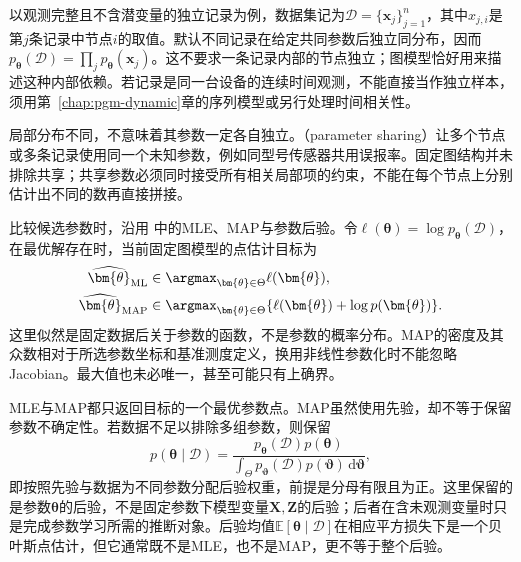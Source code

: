 以观测完整且不含潜变量的独立记录为例，数据集记为$\mathcal{D}=\{\bm{x}_j\}_{j=1}^n$，其中$x_{j,i}$是第$j$条记录中节点$i$的取值。默认不同记录在给定共同参数后独立同分布，因而$p_{\bm{\theta}}(\mathcal{D})=\prod_jp_{\bm{\theta}}(\bm{x}_j)$。这不要求一条记录内部的节点独立；图模型恰好用来描述这种内部依赖。若记录是同一台设备的连续时间观测，不能直接当作独立样本，须用第~\ref{chap:pgm-dynamic}章的序列模型或另行处理时间相关性。

局部分布不同，不意味着其参数一定各自独立。（parameter sharing）让多个节点或多条记录使用同一个未知参数，例如同型号传感器共用误报率。固定图结构并未排除共享；共享参数必须同时接受所有相关局部项的约束，不能在每个节点上分别估计出不同的数再直接拼接。

比较候选参数时，沿用
中的MLE、MAP与参数后验。令$\ell(\bm{\theta})=\log p_{\bm{\theta}}(\mathcal{D})$，
在最优解存在时，当前固定图模型的点估计目标为
\begin{equation}
  \begin{aligned}
    \widehat{\bm{\theta}}_{\mathrm{ML}}
      &\in\argmax_{\bm{\theta}\in\Theta}\ell(\bm{\theta}),\\
    \widehat{\bm{\theta}}_{\mathrm{MAP}}
      &\in\argmax_{\bm{\theta}\in\Theta}
        \{\ell(\bm{\theta})+\log p(\bm{\theta})\}.
  \end{aligned}
  \label{eq:pgm-parameter-learning-point-objectives}
\end{equation}
这里似然是固定数据后关于参数的函数，不是参数的概率分布。MAP的密度及其众数相对于所选参数坐标和基准测度定义，换用非线性参数化时不能忽略Jacobian。最大值也未必唯一，甚至可能只有上确界。

MLE与MAP都只返回目标的一个最优参数点。MAP虽然使用先验，却不等于保留参数不确定性。若数据不足以排除多组参数，则保留
\begin{equation}
  p(\bm{\theta}\mid\mathcal{D})
  =\frac{p_{\bm{\theta}}(\mathcal{D})p(\bm{\theta})}
  {\int_\Theta p_{\bm{\vartheta}}(\mathcal{D})
    p(\bm{\vartheta})\,\mathrm{d}\bm{\vartheta}},
  \label{eq:pgm-parameter-learning-parameter-posterior}
\end{equation}
即按照先验与数据为不同参数分配后验权重，前提是分母有限且为正。这里保留的是参数$\bm{\theta}$的后验，不是固定参数下模型变量$\bm{X},\bm{Z}$的后验；后者在含未观测变量时只是完成参数学习所需的推断对象。后验均值$\mathbb{E}[\bm{\theta}\mid\mathcal{D}]$在相应平方损失下是一个贝叶斯点估计，但它通常既不是MLE，也不是MAP，更不等于整个后验。

